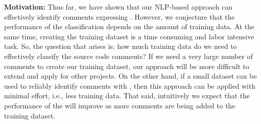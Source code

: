 
\vspace{3mm}
\noindent\rqiii
\vspace{3mm}

\noindent \textbf{Motivation:} Thus far, we have shown that our NLP-based approach can effectively identify comments expressing \SATD. However, we conjecture that the performance of the classification depends on the amount of training data. At the same time, creating the training dataset is a time consuming and labor intensive task. So, the question that arises is: how much training data do we need to effectively classify the source code comments? If we need a very large number of comments to create our training dataset, our approach will be more difficult to extend and apply for other projects. On the other hand, if a small dataset can be used to reliably identify comments with \SATD, then this approach can be applied with minimal effort, i.e., less training data. That said, intuitively we expect that the performance of the  will improve as more comments are being added to the training dataset.

